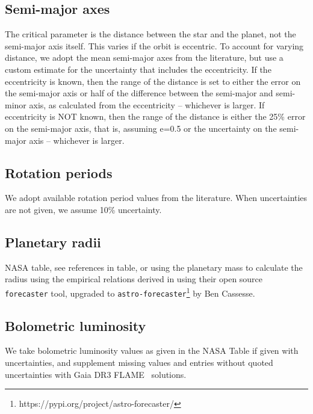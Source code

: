 \documentclass[twocolumn]{aastex631}
\begin{document}
\subsection{Semi-major axes}
\label{sec:data:a}
The critical parameter is the distance between the star and the planet, not the semi-major axis itself. This varies if the orbit is eccentric. To account for varying distance, we adopt the mean semi-major axes from the literature, but use a custom estimate for the uncertainty that includes the eccentricity.
If the eccentricity is known, then the range of the distance is set to either the error on the semi-major axis or half of the difference between the semi-major and semi-minor axis, as calculated from the eccentricity -- whichever is larger. If eccentricity is NOT known, then the range of the distance is either the 25\% error on the semi-major axis, that is, assuming e=0.5 or the uncertainty on the semi-major axis -- whichever is larger.

\subsection{Rotation periods}
We adopt available rotation period values from the literature. When uncertainties are not given, we assume 10\% uncertainty.%

\subsection{Planetary radii}
NASA table, see references in table, or using the planetary mass to calculate the radius using the empirical relations derived in \cite{chen2007} using their open source \texttt{forecaster} tool, upgraded to \texttt{astro-forecaster}\footnote{https://pypi.org/project/astro-forecaster/} by Ben Cassesse. 






\subsection{Bolometric luminosity}

We take bolometric luminosity values as given in the NASA Table if given with uncertainties, and supplement missing values and entries without quoted uncertainties with Gaia DR3 FLAME~\citep{fouesneau2022gaia} solutions. 

\end{document}
